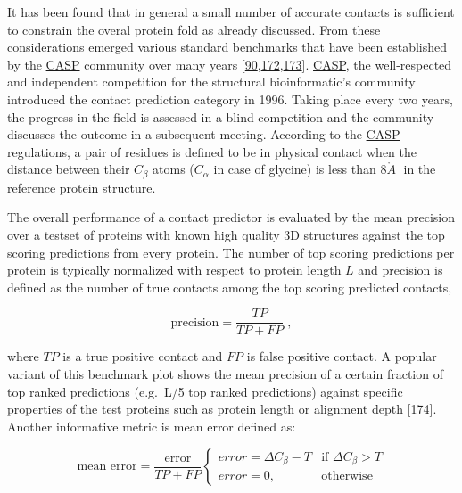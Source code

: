 \documentclass[11pt,a4paper,twoside]{book}
\newcommand{\Cb}{C_\beta}
\newcommand{\angstrom}{\mathring{A} \;}
\theoremstyle{definition}
\theoremstyle{definition}
\theoremstyle{remark}
\begin{document}
It has been found that in general a small number of accurate contacts is
sufficient to constrain the overal protein fold as already discussed.
From these considerations emerged various standard benchmarks that have
been established by the \protect\hyperlink{abbrev}{CASP} community over
many years
{[}\protect\hyperlink{ref-Monastyrskyy2015}{90},\protect\hyperlink{ref-Monastyrskyy2011}{172},\protect\hyperlink{ref-Monastyrskyy2014a}{173}{]}.
\protect\hyperlink{abbrev}{CASP}, the well-respected and independent
competition for the structural bioinformatic's community introduced the
contact prediction category in 1996. Taking place every two years, the
progress in the field is assessed in a blind competition and the
community discusses the outcome in a subsequent meeting. According to
the \protect\hyperlink{abbrev}{CASP} regulations, a pair of residues is
defined to be in physical contact when the distance between their
\(\Cb\) atoms (\(C_{\alpha}\) in case of glycine) is less than
\(8 \angstrom\) in the reference protein structure.

The overall performance of a contact predictor is evaluated by the mean
precision over a testset of proteins with known high quality 3D
structures against the top scoring predictions from every protein. The
number of top scoring predictions per protein is typically normalized
with respect to protein length \(L\) and precision is defined as the
number of true contacts among the top scoring predicted contacts,

\begin{equation}
    \textrm{precision}  = \frac{TP}{TP + FP} \; ,
\end{equation}

where \(TP\) is a true positive contact and \(FP\) is false positive
contact. A popular variant of this benchmark plot shows the mean
precision of a certain fraction of top ranked predictions (e.g.~L/5 top
ranked predictions) against specific properties of the test proteins
such as protein length or alignment depth
{[}\protect\hyperlink{ref-Ashkenazy2009}{174}{]}. Another informative
metric is mean error defined as:

\begin{equation}
    \textrm{mean error}  = \frac{\textrm{error}}{TP + FP} 
        \begin{cases}
            error = \Delta\Cb - T & \text{if } \Delta\Cb > T\\
            error = 0, &\text{otherwise }
        \end{cases}
\end{equation}
\end{document}
